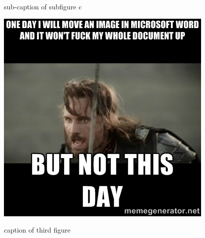 \documentclass{article}
\begin{document}
\begin{figure}[h]
{\begin{subfloatrow}[3]
        \ffigbox
        {
         \caption{sub-caption of subfigure c}
         \label{subfig3}
        }
        {\includegraphics[width=\linewidth]{./img/62392602}}
    \end{subfloatrow} 
    }
    {
     \caption{caption of third figure}
     \label{fig3}
    }
\end{figure}


     
\end{document}
